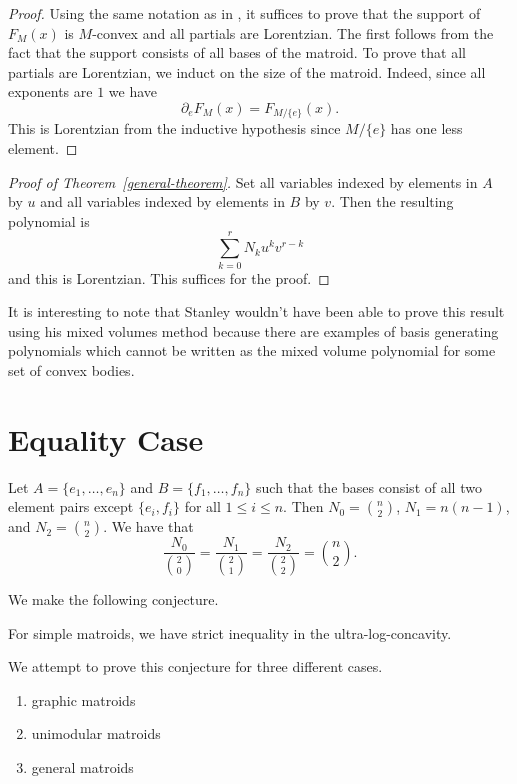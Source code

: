 \documentclass[12pt]{article}
\begin{document}
\begin{proof}
	Using the same notation as in \cite{lorentzian-polynomials}, it suffices to prove that the support of $F_M(x)$ is $M$-convex and all partials are Lorentzian. The first follows from the fact that the support consists of all bases of the matroid. To prove that all partials are Lorentzian, we induct on the size of the matroid. Indeed, since all exponents are $1$ we have 
	\[
		\partial_e F_M(x) = F_{M / \{e\}} (x).
	\]
	This is Lorentzian from the inductive hypothesis since $M / \{e\}$ has one less element. 
\end{proof}

\begin{proof}[Proof of Theorem~\ref{general-theorem}]
	Set all variables indexed by elements in $A$ by $u$ and all variables indexed by elements in $B$ by $v$. Then the resulting polynomial is 
	\[
		\sum_{k = 0}^r N_k u^k v^{r-k}
	\]
	and this is Lorentzian. This suffices for the proof. 
\end{proof}

It is interesting to note that Stanley wouldn't have been able to prove this result using his mixed volumes method because there are examples of basis generating polynomials which cannot be written as the mixed volume polynomial for some set of convex bodies. 

\section{Equality Case}

\begin{example}
	Let $A = \{e_1, \ldots, e_n\}$ and $B = \{f_1, \ldots, f_n\}$ such that the bases consist of all two element pairs except $\{e_i, f_i\}$ for all $1 \leq i \leq n$. Then $N_0 = \binom{n}{2}$, $N_1 = n(n-1)$, and $N_2 = \binom{n}{2}$. We have that 
	\[
		\frac{N_0}{\binom{2}{0}} = \frac{N_1}{\binom{2}{1}} = \frac{N_2}{\binom{2}{2}} = \binom{n}{2}. 
	\]
\end{example}

We make the following conjecture. 

\begin{conj} \label{new-conjecture}
	For simple matroids, we have strict inequality in the ultra-log-concavity. 
\end{conj}

We attempt to prove this conjecture for three different cases. 
\begin{enumerate}[label = (\roman*)]
	\item graphic matroids
	\item unimodular matroids
	\item general matroids 
\end{enumerate}
\end{document}
